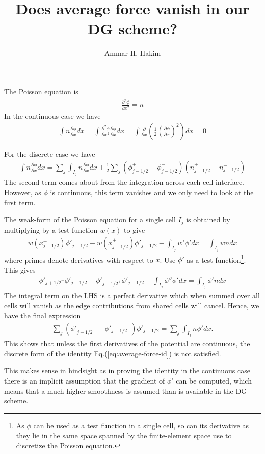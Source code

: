 \documentclass[11pt, reqno]{amsart}
\title{Does average force vanish in our DG scheme?}%
\author{Ammar H. Hakim}%
\date{}
\newcommand{\eqr}[1]{Eq.\thinspace(#1)}
\theoremstyle{definition}
\begin{document}
\maketitle

The Poisson equation is
\begin{align}
  \frac{\partial^2 \phi}{\partial x^2} = n
\end{align}
In the continuous case we have
\begin{align}
  \int n\frac{\partial \phi}{\partial x} dx 
  = 
  \int \frac{\partial^2 \phi}{\partial x^2} \frac{\partial \phi}{\partial x} dx 
  =
  \int \frac{\partial }{\partial x}\left(
  \frac{1}{2} \left(\frac{\partial \phi}{\partial x}\right)^2
  \right) dx
  =
  0
  \label{eq:average-force-id}
\end{align}

For the discrete case we have
\begin{align}
  \int n\frac{\partial \phi}{\partial x} dx 
  =
  \sum_j \int_{I_j} n\frac{\partial \phi}{\partial x} dx 
  + \frac{1}{2}\sum_j (\phi_{j-1/2}^+ - \phi_{j-1/2}^-)(n_{j-1/2}^+ + n_{j-1/2}^-)
\end{align}
The second term comes about from the integration across each cell
interface. However, as $\phi$ is continuous, this term vanishes and we
only need to look at the first term.

The weak-form of the Poisson equation for a single cell $I_j$ is
obtained by multiplying by a test function $w(x)$ to give
\begin{align}
  w(x_{j+1/2}^-)\phi'_{j+1/2} - w(x_{j-1/2}^+)\phi'_{j-1/2} -
  \int_{I_j} w'\phi' dx
  =
  \int_{I_j} wn dx
\end{align}
where primes denote derivatives with respect to $x$. Use $\phi'$ as a
test function\footnote{As $\phi$ can be used as a test function in a
  single cell, so can its derivative as they lie in the same space
  spanned by the finite-element space use to discretize the Poisson
  equation.}. This gives
\begin{align}
  \phi'_{{j+1/2}^-}\phi'_{j+1/2} - \phi'_{{j-1/2}^+}\phi'_{j-1/2} -
  \int_{I_j} \phi''\phi' dx
  =
  \int_{I_j} \phi'n dx
\end{align}
The integral term on the LHS is a perfect derivative which when summed
over all cells will vanish as the edge contributions from shared cells
will cancel. Hence, we have the final expression
\begin{align}
  \sum_j \left(\phi'_{{j-1/2}^+} -
  \phi'_{{j-1/2}^-}\right)\phi'_{j-1/2}
  =
  \sum_j \int_{I_j}n\phi' dx.
\end{align}
This shows that unless the first derivatives of the potential are
continuous, the discrete form of the identity
\eqr{\ref{eq:average-force-id}} is not satisfied. 

This makes sense in hindsight as in proving the identity in the
continuous case there is an implicit assumption that the gradient of
$\phi'$ can be computed, which means that a much higher smoothness is
assumed than is available in the DG scheme.
\end{document}
